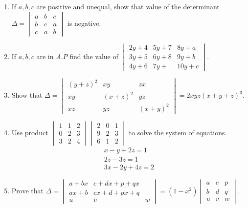 \begin{enumerate}
\item If $a, b, c$ are positive and unequal, show that value of the determinant $\Delta=\begin{vmatrix}a&b&c \\b&c&a \\c&a&b \end{vmatrix}$ is negative.
\item If $a, b, c$ are in $A.P$ find the value of $\begin{vmatrix}2y+4&5y+7&8y+a \\3y+5&6y+8&9y+b \\ 4y+6&7y+&10y+c\end{vmatrix}$.
\item Show that $\Delta=\begin{vmatrix}(y+z)^2&xy&zx \\ xy&(x+z)^2&yz\\ xz&yz&(x+y)^2 \end{vmatrix} = 2xyz(x+y+z)^3$.
\item Use product $\begin{vmatrix}1&1&2 \\0&2&3 \\3&2&4 \end{vmatrix} \begin{vmatrix}2&0&1 \\ 9&2&3 \\6&1&2 \end {vmatrix}$ to solve the system of equations.
\begin{align}
x-y+2z=1\\ 2z-3z=1\\ 3x-2y+4z=2
\end{align}
\item Prove that $\Delta = \begin{vmatrix}a+bx&c+dx+p+qx \\ ax+b&cx+d+px+q \\ u&v&w \end{vmatrix} = (1-x^2) \begin{vmatrix}a&c&p \\b&d&q \\u&v&w \end{vmatrix}$.
\end{enumerate}
